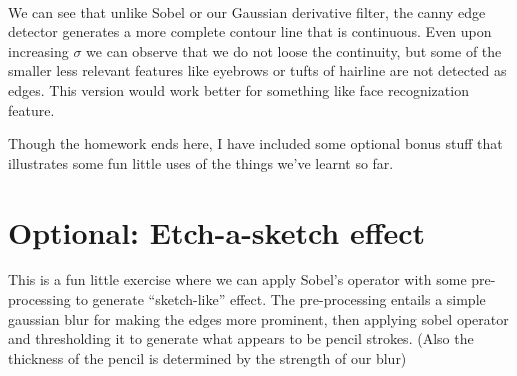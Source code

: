 \documentclass[11pt]{article}
\begin{document}
    \begin{center}
    \end{center}
    { \hspace*{\fill} \\}
    
    We can see that unlike Sobel or our Gaussian derivative filter, the
canny edge detector generates a more complete contour line that is
continuous. Even upon increasing \(\sigma\) we can observe that we do
not loose the continuity, but some of the smaller less relevant features
like eyebrows or tufts of hairline are not detected as edges. This
version would work better for something like face recognization feature.

    Though the homework ends here, I have included some optional bonus stuff
that illustrates some fun little uses of the things we've learnt so far.

    \hypertarget{optional-etch-a-sketch-effect}{%
\section{Optional: Etch-a-sketch
effect}\label{optional-etch-a-sketch-effect}}

    This is a fun little exercise where we can apply Sobel's operator with
some pre-processing to generate ``sketch-like'' effect. The
pre-processing entails a simple gaussian blur for making the edges more
prominent, then applying sobel operator and thresholding it to generate
what appears to be pencil strokes. (Also the thickness of the pencil is
determined by the strength of our blur)
\end{document}
